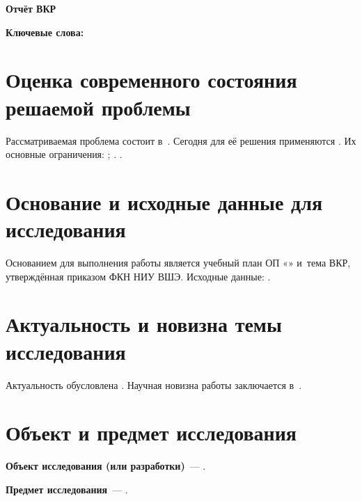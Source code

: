 \documentclass[12pt,a4paper]{extarticle}
\begin{document}
\sloppy



\begin{center}
  \textbf{\large Отчёт ВКР}
\end{center}

\vspace{0.4em}

\noindent\textbf{Ключевые слова:} 

\section{Оценка современного состояния решаемой проблемы}
Рассматриваемая проблема состоит в~. Сегодня для её решения применяются  \cite{example-en}. Их основные ограничения: ; . .

\section{Основание и исходные данные для исследования}
Основанием для выполнения работы является учебный план ОП «\hseSpecialization» и~тема ВКР, утверждённая приказом ФКН НИУ ВШЭ. Исходные данные: .

\section{Актуальность и новизна темы исследования}
Актуальность обусловлена . Научная новизна работы заключается в~.

\section{Объект и предмет исследования}
\textbf{Объект исследования (или разработки)}~--- .

\textbf{Предмет исследования}~--- .
\end{document}
